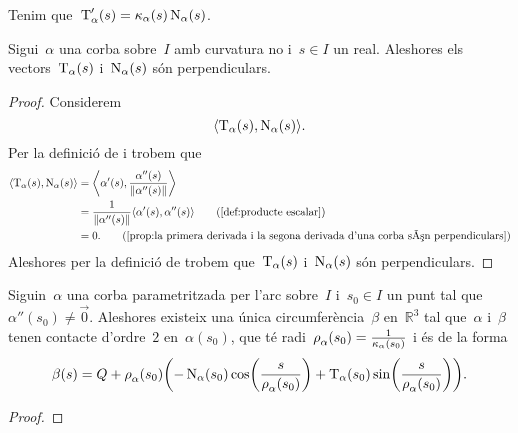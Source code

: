 \documentclass[../../main.tex]{subfiles}
\begin{document}
    \begin{observation}
        \label{obs:la derivada de la tangent és la curvatura per la normal}
        Tenim que~\(\operatorname{T}_{\alpha}'(s)=\operatorname{\kappa}_{\alpha}(s)\operatorname{N}_{\alpha}(s)\).
    \end{observation}
    \begin{proposition}
        \label{prop:la tangent i la normal d'una corba amb curvatura no nula són perpendiculars}
        Sigui~\(\alpha\) una corba sobre~\(I\) amb curvatura no \nulla{} i~\(s\in I\) un real.
        Aleshores els vectors~\(\operatorname{T}_{\alpha}(s)\) i~\(\operatorname{N}_{\alpha}(s)\) són perpendiculars.
        \begin{proof}
            Considerem
            \[
                \prodesc{\tangent_{\alpha}(s)}{\normal_{\alpha}(s)}.
            \]
            Per la definició de  i  trobem que
            \begin{align*}
                \prodesc{\tangent_{\alpha}(s)}{\normal_{\alpha}(s)}&=\prodesc[\bigg]{\alpha'(s)}{\frac{\alpha''(s)}{\norm{\alpha''(s)}}} \\
                &=\frac{1}{\norm{\alpha''(s)}}\prodesc{\alpha'(s)}{\alpha''(s)} \tag{\ref{def:producte escalar}} \\
                &=0.
                \tag{\ref{prop:la primera derivada i la segona derivada d'una corba són perpendiculars}}
            \end{align*}
            Aleshores per la definició de  trobem que~\(\operatorname{T}_{\alpha}(s)\) i~\(\operatorname{N}_{\alpha}(s)\) són perpendiculars.
        \end{proof}
    \end{proposition}
    \begin{proposition}
        \label{prop:circumferència osculadora}
        Siguin~\(\alpha\) una corba parametritzada per l'arc sobre~\(I\) i~\(s_{0}\in I\) un punt tal que~\(\alpha''(s_{0})\neq\vec{0}\).
        Aleshores existeix una única circumferència~\(\beta\) en~\(\mathbb{R}^{3}\) tal que~\(\alpha\) i~\(\beta\) tenen contacte d'ordre~\(2\) en~\(\alpha(s_{0})\), que té radi~\(\operatorname{\rho}_{\alpha}(s_{0})=\frac{1}{\operatorname{\kappa}_{\alpha}(s_{0})}\) i és de la forma
        \[
            \beta(s)=Q+\radicircosculadora_{\alpha}(s_{0})\left(-\normal_{\alpha}(s_{0})\cos\left(\frac{s}{\radicircosculadora_{\alpha}(s_{0})}\right)+\tangent_{\alpha}(s_{0})\sin\left(\frac{s}{\radicircosculadora_{\alpha}(s_{0})}\right)\right).
        \]
        \begin{proof}
%
        \end{proof}
    \end{proposition}
\end{document}
